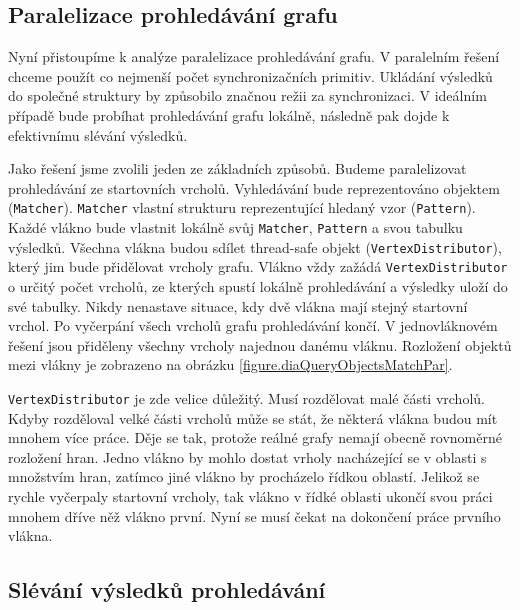 \subsection{Paralelizace prohledávání grafu} \label{anal.matchPar}

Nyní přistoupíme k analýze paralelizace prohledávání grafu.
V paralelním řešení chceme použít co nejmenší počet synchronizačních primitiv.
Ukládání výsledků do společné struktury by způsobilo značnou režii za synchronizaci.
V ideálním případě bude probíhat prohledávání grafu lokálně, následně pak dojde k efektivnímu slévání výsledků.

Jako řešení jsme zvolili jeden ze základních způsobů.
Budeme paralelizovat prohledávání ze startovních vrcholů.
Vyhledávání bude reprezentováno objektem (\texttt{Matcher}).
\texttt{Matcher} vlastní strukturu reprezentující hledaný vzor (\texttt{Pattern}).
Každé vlákno bude vlastnit lokálně svůj \texttt{Matcher}, \texttt{Pattern} a svou tabulku výsledků.
Všechna vlákna budou sdílet thread-safe objekt (\texttt{VertexDistributor}), který jim bude přidělovat vrcholy grafu.
Vlákno vždy zažádá \texttt{VertexDistributor} o určitý počet vrcholů, ze kterých spustí lokálně prohledávání a výsledky uloží do své tabulky.
Nikdy nenastave situace, kdy dvě vlákna mají stejný startovní vrchol.
Po vyčerpání všech vrcholů grafu prohledávání končí.
V jednovláknovém řešení jsou přiděleny všechny vrcholy najednou danému vláknu. 
Rozložení objektů mezi vlákny je zobrazeno na obrázku \ref{figure.diaQueryObjectsMatchPar}. 

\texttt{VertexDistributor} je zde velice důležitý.
Musí rozdělovat malé části vrcholů.
Kdyby rozděloval velké části vrcholů může se stát, že některá vlákna budou mít mnohem více práce.
Děje se tak, protože reálné grafy nemají obecně rovnoměrné rozložení hran.
Jedno vlákno by mohlo dostat vrholy nacházející se v oblasti s množstvím hran, zatímco jiné vlákno by procházelo řídkou oblastí.
Jelikož se rychle vyčerpaly startovní vrcholy, tak vlákno v řídké oblasti ukončí svou práci mnohem dříve něž vlákno první.
Nyní se musí čekat na dokončení práce prvního vlákna.

\subsection{Slévání výsledků prohledávání} \label{anal.match.merge}

